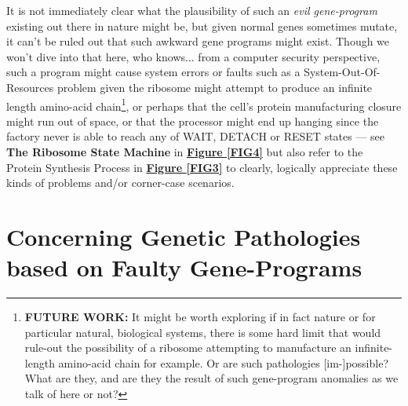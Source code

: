 \documentclass[a4paper, 18pt]{book} %
\begin{document}
It is not immediately clear what the plausibility of such an \textit{evil gene-program} existing out there in nature might be, but given normal genes sometimes mutate\cite{gregory1987oxford}, it can't be ruled out that such awkward gene programs might exist. Though we won't dive into that here, who knows... from a computer security perspective, such a program might cause system errors or faults such as a System-Out-Of-Resources problem given the ribosome might attempt to produce an infinite length amino-acid chain\footnote{\textbf{FUTURE WORK:} It might be worth exploring if in fact nature or for particular natural, biological systems, there is some hard limit that would rule-out the possibility of a ribosome attempting to manufacture an infinite-length amino-acid chain for example. Or are such pathologies [im-]possible? What are they, and are they the result of such gene-program anomalies as we talk of here or not?}, or perhaps that the cell's protein manufacturing closure might run out of space, or that the processor might end up hanging since the factory never is able to reach any of WAIT, DETACH or RESET states --- see \textbf{The Ribosome State Machine} in \textbf{\hyperref[FIG4]{Figure \ref{FIG4}}} but also refer to the Protein Synthesis Process in \textbf{\hyperref[FIG3]{Figure \ref{FIG3}}} to clearly, logically appreciate these kinds of problems and/or corner-case scenarios. 

\section{Concerning Genetic Pathologies based on Faulty Gene-Programs}
\end{document}
